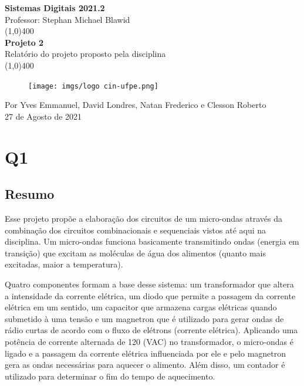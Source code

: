 \documentclass[12pt]{article}
\begin{document}
\begin{titlepage}
\begin{center}
\vspace*{1cm}
\Large{\textbf{Sistemas Digitais 2021.2}\\Professor: Stephan Michael Blawid}\\
\vfill
\line(1,0){400}\\[1mm]
\huge{\textbf{Projeto 2}}\\[3mm]
\Large{Relatório do projeto proposto pela disciplina}\\[1mm]
\line(1,0){400}
\vfill
\begin{figure}[!htb]
    \centering
    \texttt{[image: imgs/logo cin-ufpe.png]}\\
    \label{fig:logo}
\end{figure}
Por Yves Emmanuel, David Londres, Natan Frederico e Clesson Roberto\\27 de Agosto de 2021
\end{center}
\end{titlepage}

\setcounter{page}{1}

\section*{Q1}

\subsection*{Resumo}

Esse projeto propõe a elaboração dos circuitos de um micro-ondas através da combinação dos circuitos combinacionais e sequenciais vistos até aqui na disciplina. Um micro-ondas funciona basicamente transmitindo ondas (energia em transição) que excitam as moléculas de água dos alimentos (quanto mais excitadas, maior a temperatura).


Quatro componentes formam a base desse sistema: um transformador que altera a intensidade da corrente elétrica, um diodo que permite a passagem da corrente elétrica em um sentido, um capacitor que armazena cargas elétricas quando submetido à uma tensão e um magnetron que é utilizado para gerar ondas de rádio curtas de acordo com o fluxo de elétrons (corrente elétrica). Aplicando uma potência de corrente alternada de 120 (VAC) no transformador, o micro-ondas é ligado e a passagem da corrente elétrica influenciada por ele e pelo magnetron gera as ondas necessárias para aquecer o alimento. Além disso, um contador é utilizado para determinar o fim do tempo de aquecimento.
\end{document}
